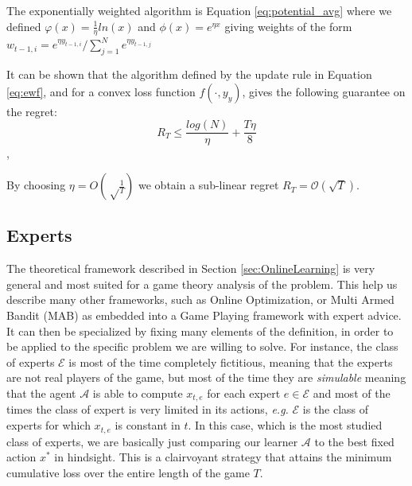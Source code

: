 \begin{definition}\label{eq:ewf}
	The exponentially weighted algorithm is Equation \eqref{eq:potential_avg} where we defined $\varphi(x)=\frac{1}{\eta}ln(x)$ and $\phi(x)=e^{\eta x}$ giving weights of the form $w_{t-1,i}=e^{\eta y_{t-1,i}}/\sum\limits_{j=1}^Ne^{\eta y_{t-1,j}}$
\end{definition}

It can be shown  that the algorithm defined by the update rule in Equation \eqref{eq:ewf}, and for a convex loss function $f(\cdot,y_y)$, gives the following guarantee on the regret:
\begin{equation}\label{eq:regret_ewf}
R_T\le \frac{log(N)}{\eta}+\frac{T\eta}{8}\end{equation},

By choosing $\eta=O\left(\sqrt\frac{1}{T}\right)$ we obtain a sub-linear regret $R_T=\mathcal O(\sqrt T)$. %



\subsection{Experts}
The theoretical framework described in Section \ref{sec:OnlineLearning} is very general and most suited for a game theory analysis of the problem. This help us describe many other frameworks, such as Online Optimization, or Multi Armed Bandit (MAB) as embedded into a Game Playing framework with expert advice. It can then be specialized by fixing many elements of the definition, in order to be applied to the specific problem we are willing to solve.
For instance, the class of experts $\mathcal E$ is most of the time completely fictitious, meaning that the experts are not real players of the game, but most of the time they are \emph{simulable} meaning that the agent $\mathcal A$ is able to compute $x_{t,e}$ for each expert $e\in\mathcal E$ and most of the times the class of expert is very limited in its actions, \emph{e.g.} $\mathcal E$ is the class of experts for which $x_{t,e}$ is constant in $t$. In this case, which is the most studied class of experts, we are basically just comparing our learner $\mathcal A$ to the best fixed action $x^*$ in hindsight. This is a clairvoyant strategy that attains the minimum cumulative loss over the entire length of the game $T$.

